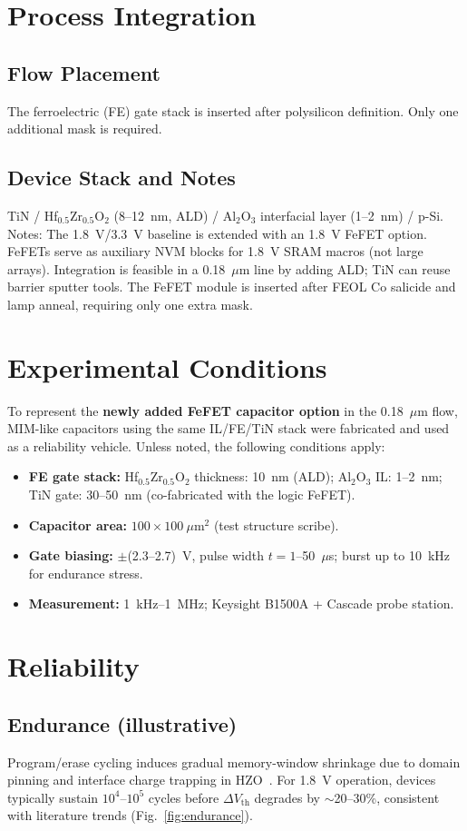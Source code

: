 \documentclass[conference]{IEEEtran}
\begin{document}
\section{Process Integration}
\subsection{Flow Placement}
The ferroelectric (FE) gate stack is inserted after polysilicon definition. Only one additional mask is required.

\subsection{Device Stack and Notes}
TiN / Hf$_{0.5}$Zr$_{0.5}$O$_2$ (8--12~nm, ALD) / Al$_2$O$_3$ interfacial layer (1--2~nm) / p-Si. Notes: The 1.8~V/3.3~V baseline is extended with an 1.8~V FeFET option. FeFETs serve as auxiliary NVM blocks for 1.8~V SRAM macros (not large arrays). Integration is feasible in a 0.18~$\mu$m line by adding ALD; TiN can reuse barrier sputter tools. The FeFET module is inserted after FEOL Co salicide and lamp anneal, requiring only one extra mask.

\section{Experimental Conditions}
To represent the \textbf{newly added FeFET capacitor option} in the 0.18~$\mu$m flow, MIM-like capacitors using the same IL/FE/TiN stack were fabricated and used as a reliability vehicle. Unless noted, the following conditions apply:
\begin{itemize}
  \item \textbf{FE gate stack:} Hf$_{0.5}$Zr$_{0.5}$O$_2$ thickness: 10~nm (ALD); Al$_2$O$_3$ IL: 1--2~nm; TiN gate: 30--50~nm (co-fabricated with the logic FeFET).
  \item \textbf{Capacitor area:} $100 \times 100~\mu$m$^2$ (test structure scribe).
  \item \textbf{Gate biasing:} $\pm$(2.3--2.7)~V, pulse width $t = 1$--50~$\mu$s; burst up to 10~kHz for endurance stress.
  \item \textbf{Measurement:} 1~kHz--1~MHz; Keysight B1500A + Cascade probe station.
\end{itemize}

\section{Reliability}
\subsection{Endurance (illustrative)}
Program/erase cycling induces gradual memory-window shrinkage due to domain pinning and interface charge trapping in HZO~\cite{Boscke2011,Mueller2012}. For 1.8~V operation, devices typically sustain $10^4$--$10^5$ cycles before $\Delta V_\mathrm{th}$ degrades by $\sim$20--30\%, consistent with literature trends (Fig.~\ref{fig:endurance}).
\end{document}
